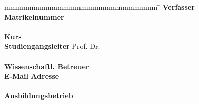 \begin{titlepage}
\begin{center}
		\end{center}
		\vfill
		\begin{spacing}{1.2}
			\begin{tabbing}
				mmmmmmmmmmmmmmmmmmmmmmmmmm     \= \kill
                \textbf{Verfasser} \> \verfasser\\
				\textbf{Matrikelnummer}  \>  \martrikelnr\\
                \\
                \textbf{Kurs} \> \kurs\\
                \textbf{Studiengangsleiter} \> Prof. Dr. \studiengangsleiter \\
                \\
                \textbf{Wissenschaftl. Betreuer} \> \betreuer \\
                \textbf{E-Mail Adresse} \> \betreuermail\\
                \\
				\textbf{Ausbildungsbetrieb}      \>  \ausbildungsbetrieb\\
                                                \> \ausbildungsadresse\\
                                                \> \ausbildungsort\\

			\end{tabbing}
		\end{spacing}
\end{titlepage} 
